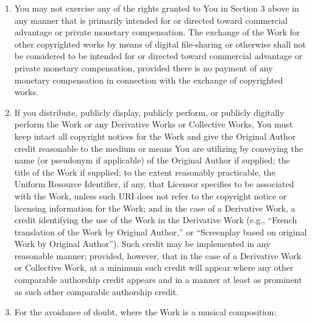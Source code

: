 \begin{enumerate}
\begin{enumerate}
\item You may not exercise any of the rights granted to You in Section
3 above in any manner that is primarily intended for or directed
toward commercial advantage or private monetary compensation. The
exchange of the Work for other copyrighted works by means of digital
file-sharing or otherwise shall not be considered to be intended for
or directed toward commercial advantage or private monetary
compensation, provided there is no payment of any monetary
compensation in connection with the exchange of copyrighted works.

\item If you distribute, publicly display, publicly perform, or
publicly digitally perform the Work or any Derivative Works or
Collective Works, You must keep intact all copyright notices for the
Work and give the Original Author credit reasonable to the medium or
means You are utilizing by conveying the name (or pseudonym if
applicable) of the Original Author if supplied; the title of the Work
if supplied; to the extent reasonably practicable, the Uniform
Resource Identifier, if any, that Licensor specifies to be associated
with the Work, unless such URI does not refer to the copyright notice
or licensing information for the Work; and in the case of a Derivative
Work, a credit identifying the use of the Work in the Derivative Work
(e.g., ``French translation of the Work by Original Author,'' or
``Screenplay based on original Work by Original Author''). Such credit
may be implemented in any reasonable manner; provided, however, that
in the case of a Derivative Work or Collective Work, at a minimum such
credit will appear where any other comparable authorship credit
appears and in a manner at least as prominent as such other comparable
authorship credit.

\item For the avoidance of doubt, where the Work is a musical composition:


\end{enumerate}
\end{enumerate}
